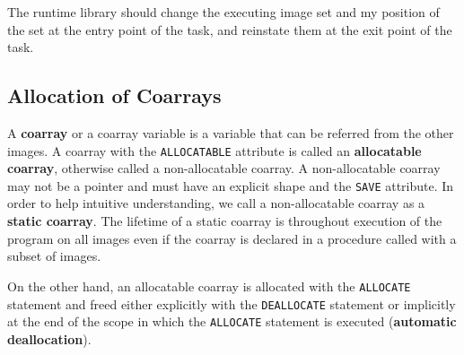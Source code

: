 
\requirement
The runtime library should change the executing image set and my position of the set 
at the entry point of the task, and reinstate them at the exit point of the task.



\subsection{Allocation of Coarrays}\label{sec:spec-coarray}

A {\bf coarray} or a coarray variable is a variable that can be referred from the other images. 
A coarray with the {\tt ALLOCATABLE} attribute is called an {\bf allocatable coarray}, 
otherwise called a non-allocatable coarray. A non-allocatable coarray may not be a pointer 
and must have an explicit shape and the {\tt SAVE} attribute. In order to help 
intuitive understanding, we call a non-allocatable coarray as a {\bf static coarray}. 
The lifetime of a static coarray is throughout execution of the program on all images even if
the coarray is declared in a procedure called with a subset of images.

On the other hand, an allocatable coarray is allocated with the {\tt ALLOCATE} statement and 
freed either explicitly with the {\tt DEALLOCATE} statement or implicitly at the end of the 
scope in which the {\tt ALLOCATE} statement is executed ({\bf automatic deallocation}).

